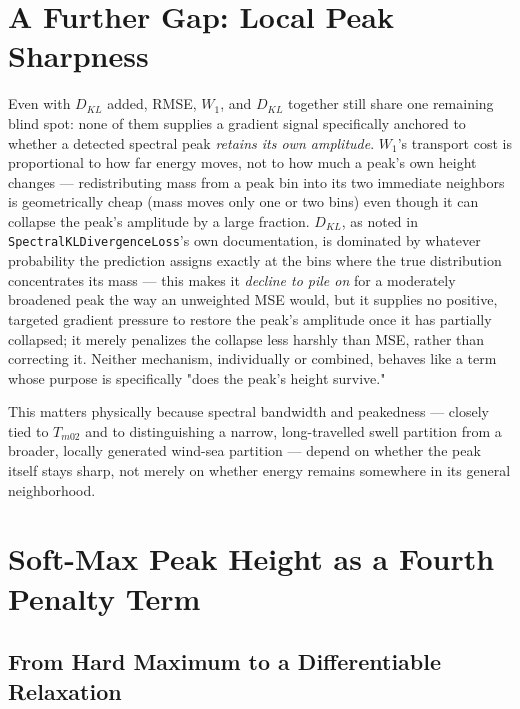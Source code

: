 \documentclass[11pt,a4paper]{article}
\begin{document}
\section{A Further Gap: Local Peak Sharpness}
\label{sec:gap2}

Even with $D_{KL}$ added, RMSE, $W_1$, and $D_{KL}$ together still share one
remaining blind spot: none of them supplies a gradient signal specifically
anchored to whether a detected spectral peak \emph{retains its own
amplitude}. $W_1$'s transport cost is proportional to how far energy moves,
not to how much a peak's own height changes — redistributing mass from a
peak bin into its two immediate neighbors is geometrically cheap (mass moves
only one or two bins) even though it can collapse the peak's amplitude by a
large fraction. $D_{KL}$, as noted in \texttt{SpectralKLDivergenceLoss}'s
own documentation, is dominated by whatever probability the prediction
assigns exactly at the bins where the true distribution concentrates its
mass — this makes it \emph{decline to pile on} for a moderately broadened
peak the way an unweighted MSE would, but it supplies no positive, targeted
gradient pressure to restore the peak's amplitude once it has partially
collapsed; it merely penalizes the collapse less harshly than MSE, rather
than correcting it. Neither mechanism, individually or combined, behaves
like a term whose purpose is specifically "does the peak's height survive."

This matters physically because spectral bandwidth and peakedness — closely
tied to $T_{m02}$ and to distinguishing a narrow, long-travelled swell
partition from a broader, locally generated wind-sea partition — depend on
whether the peak itself stays sharp, not merely on whether energy remains
somewhere in its general neighborhood.

\section{Soft-Max Peak Height as a Fourth Penalty Term}
\label{sec:softmax}

\subsection{From Hard Maximum to a Differentiable Relaxation}
\end{document}
